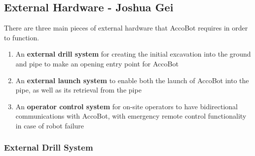 \documentclass[11pt]{article}		%
\begin{document}
		\subsection[External Hardware]{External Hardware - Joshua Gei}
		
		    There are three main pieces of external hardware that AccoBot requires in order to function.
        
        \begin{enumerate}
            \item An \textbf{external drill system} for creating the initial excavation into the ground and pipe to make an opening entry point for AccoBot
            \item An \textbf{external launch system} to enable both the launch of AccoBot into the pipe, as well as its retrieval from the pipe
            \item An \textbf{operator control system} for on-site operators to have bidirectional communications with AccoBot, with emergency remote control functionality in case of robot failure
        \end{enumerate}
		
		\subsubsection{External Drill System}
		    
\end{document}
